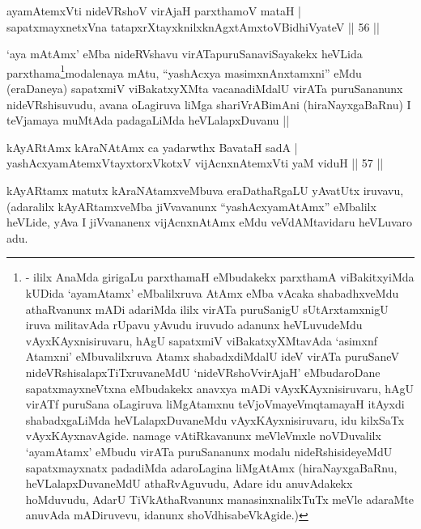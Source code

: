 \begin{shl}
ayamAtemxVti nideVRshoV virAjaH parxthamoV mataH |\\
sapatxmayxnetxVna tatapxrXtayxknilxknAgxtAmx\s toV\s BidhiVyateV \hfill || 56 ||
\end{shl}

\begin{artha}
`aya mAtAmx' eMba nideRVshavu virATapuruSanaviSayakekx heVLida
  parxthama\footnote[1]{- ililx AnaMda girigaLu parxthamaH eMbudakekx
    parxthamA viBakitxyiMda kUDida `ayamAtamx' eMbalilxruva AtAmx eMba
    vAcaka shabadhxveMdu athaRvanunx mADi adariMda ililx virATa
    puruSa\-nigU sUtArxtamxnigU iruva militavAda rUpavu yAvudu iruvudo
    adanunx heVLuvudeMdu vAyxKAyxnisiruvaru, hAgU sapatxmiV viBakatxyXMtavAda `asimxnf Atamxni' eMbuvalilxruva Atamx shabadx\-diMdalU ideV virATa puruSaneV nideVRshisalapxTiTxruvaneMdU `nideVRshoVvirAjaH'
    eMbu\-daroDane sapatxmayxneVtxna eMbudakekx anavxya mADi
    vAyxKAyxnisiruvaru, hAgU virATf puruSana oLagiruva liMgAtamxnu
teVjoVmayeV\s mqtamayaH itAyxdi shabadxgaLiMda heVLalapxDuvaneMdu vAyxKAyxnisiruvaru,
idu kilxSaTx vAyxKAyxnavAgide. namage vAtiRkavanunx meVleVmxle
noVDuvalilx `ayamAtamx' eMbudu virATa puruSananunx modalu
nideRshisideyeMdU sapatxmayxnatx padadiMda adaroLagina liMgAtAmx
(hiraNayxgaBaRnu, heVLalapxDuvaneMdU athaRvAguvudu, Adare idu
anuvAdakekx hoMduvudu, AdarU TiVkAthaRvanunx manasinxnalilxTuTx meVle
adaraMte anuvAda mADiruvevu, idanunx shoVdhisabeVkAgide.)}modalenaya mAtu, ``yashAcxya
  masimxnAnxtamxni'' eMdu (eraDaneya) sapatxmiV viBakatxyXMta
  vacanadiMdalU virATa puruSananunx nideVRshisuvudu, avana oLagiruva
  liMga shariVrABimAni (hiraNayxgaBaRnu) I teVjamaya muMtAda
  padagaLiMda heVLalapxDuvanu ||
\end{artha}

\begin{shl}
kAyARtAmx kAraNAtAmx ca yadarwthx BavataH sadA |\\
yashAcxyamAtemxVtayxtorxVkotxV vijAcnxnAtemxVti yaM viduH \hfill || 57 ||
\end{shl}

\begin{artha}
kAyARtamx matutx kAraNAtamxveMbuva eraDathaRgaLU yAvatUtx iruvavu, (adaralilx kAyARtamxveMba jiVvavanunx ``yashAcxyamAtAmx'' eMbalilx heVLide, yAva I jiVvananenx vijAcnxnAtAmx eMdu veVdAMtavidaru heVLuvaro adu.
\end{artha}


